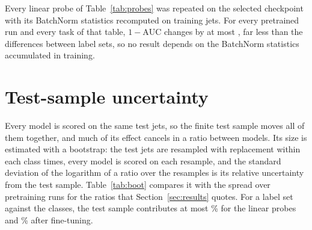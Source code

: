 \documentclass[11pt]{article}
\newcommand{\Kfull}{\VocabSizeLoneeighteight}
\newcommand{\oma}{\ensuremath{1-\mathrm{AUC}}}
\begin{document}
Every linear probe of Table~\ref{tab:probes} was repeated on the selected checkpoint with its
BatchNorm statistics recomputed on \DesignBnJets{} training jets. For every pretrained run and
every task of that table, $\oma$ changes by at most \MlstBnMaxDev, far less than the differences
between label sets, so no result depends on the BatchNorm statistics accumulated in training.

\section{Test-sample uncertainty}\label{app:boot}

Every model is scored on the same test jets, so the finite test sample moves all of them
together, and much of its effect cancels in a ratio between models. Its size is estimated
with a bootstrap: the test jets are resampled with replacement within each class
\MlstBootResamples{} times, every model is scored on each resample, and the standard deviation of
the logarithm of a ratio over the resamples is its relative uncertainty from the test sample.
Table~\ref{tab:boot} compares it with the spread over pretraining runs for the ratios that
Section~\ref{sec:results} quotes. For a label set against the \Kfull{} classes, the test sample
contributes at most \MlstBootTestMaxProbe\% for the linear probes and \MlstBootTestMaxFt\% after
fine-tuning.



\clearpage



\end{document}
